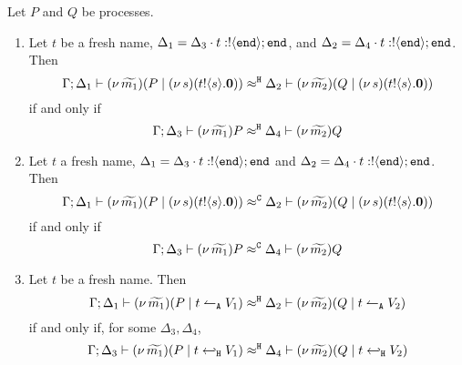 \begin{lemma}
\label{l:altrig}
Let $P$ and $Q$ be processes.
	\label{lem:alt_tr}
	\begin{enumerate}
		\item	Let $t$ be a fresh name, $\Delta_1 = \Delta_3 \cdot t: ! \langle \mathtt{end} \rangle ; \mathtt{end}$, and
				$\Delta_2 = \Delta_4 \cdot t: ! \langle \mathtt{end} \rangle ; \mathtt{end}$. Then
				\[
					\Gamma; \Delta_1 \vdash (\nu\, \widetilde{m_1})(P \;|\; (\nu\, s)(t ! \langle s \rangle . \mathbf{0})  )  \approx^\mathtt{H} \Delta_2 \vdash (\nu\, \widetilde{m_2})(Q \;|\; (\nu\, s)(t ! \langle s \rangle . \mathbf{0})  )
				\]
				if and only if%
				\[
					\Gamma; \Delta_3 \vdash (\nu\, \widetilde{m_1})P   \approx^\mathtt{H} \Delta_4 \vdash (\nu\, \widetilde{m_2})Q
				\]

		\item	Let $t$ a fresh name, $\Delta_1 = \Delta_3 \cdot t: ! \langle \mathtt{end} \rangle ; \mathtt{end}$ and
				$\Delta_2 = \Delta_4 \cdot t: ! \langle \mathtt{end} \rangle ; \mathtt{end}$. Then
				\[
					\Gamma; \Delta_1 \vdash (\nu\, \widetilde{m_1})(P \;|\; (\nu\, s)(t ! \langle s \rangle . \mathbf{0})  )  \approx^\mathtt{C} \Delta_2 \vdash (\nu\, \widetilde{m_2})(Q \;|\; (\nu\, s)(t ! \langle s \rangle . \mathbf{0})  )
				\]
				if and only if%
				\[
					\Gamma; \Delta_3 \vdash (\nu\, \widetilde{m_1})P \approx^\mathtt{C} \Delta_4 \vdash (\nu\, \widetilde{m_2})Q
				\]

		\item	Let $t$ be a fresh name. Then
				\[
					\Gamma; \Delta_1 \vdash (\nu\, \widetilde{m_1})(P \;|\; t \leftharpoonup_\mathtt{A} V_1  )  \approx^\mathtt{H} \Delta_2 \vdash (\nu\, \widetilde{m_2})(Q \;|\; t \leftharpoonup_\mathtt{A} V_2  )
				\]
				if and only if, for some $\Delta_3, \Delta_4$, 
				\[
					\Gamma; \Delta_3 \vdash (\nu\, \widetilde{m_1})(P \;|\; t \hookleftarrow_{\mathtt{H}} V_1  )  \approx^\mathtt{H} \Delta_4 \vdash (\nu\, \widetilde{m_2})(Q \;|\; t \hookleftarrow_{\mathtt{H}} V_2)
				\]
	\end{enumerate}
\end{lemma}

